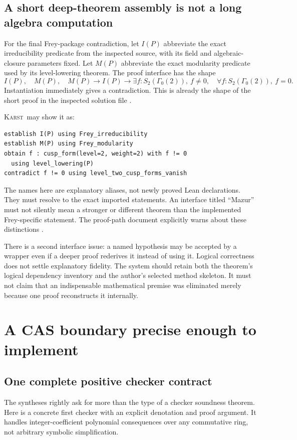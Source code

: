 \documentclass[11pt,letterpaper]{article}
\newcommand{\Karst}{\textsc{Karst}}
\theoremstyle{remark}
\begin{document}
\subsection{A short deep-theorem assembly is not a long algebra computation}
For the final Frey-package contradiction, let $I(P)$ abbreviate the exact
irreducibility predicate from the inspected source, with its field and
algebraic-closure parameters fixed. Let $M(P)$ abbreviate the exact modularity
predicate used by its level-lowering theorem. The proof interface has the
shape
\[
 I(P),\quad M(P),\quad
 M(P)\to I(P)\to\exists f:S_2(\Gamma_0(2)),\ f\ne0,
 \quad\forall f:S_2(\Gamma_0(2)),\ f=0.
\]
Instantiation immediately gives a contradiction. This is already the shape of
the short proof in the inspected solution file \cite{freysol}.

\Karst\ may show it as:
\begin{lstlisting}[caption={An interface-level sketch of the source's final contradiction.}]
establish I(P) using Frey_irreducibility
establish M(P) using Frey_modularity
obtain f : cusp_form(level=2, weight=2) with f != 0
  using level_lowering(P)
contradict f != 0 using level_two_cusp_forms_vanish
\end{lstlisting}

The names here are explanatory aliases, not newly proved Lean declarations.
They must resolve to the exact imported statements. An interface titled
``Mazur'' must not silently mean a stronger or different theorem than the
implemented Frey-specific statement. The proof-path document explicitly
warns about these distinctions \cite{fltpath}.

There is a second interface issue: a named hypothesis may be accepted by a
wrapper even if a deeper proof rederives it instead of using it. Logical
correctness does not settle explanatory fidelity. The system should retain
both the theorem's logical dependency inventory and the author's selected
method skeleton. It must not claim that an indispensable mathematical premise
was eliminated merely because one proof reconstructs it internally.

\section{A CAS boundary precise enough to implement}\label{sec:cas}

\subsection{One complete positive checker contract}
The syntheses rightly ask for more than the type of a checker soundness theorem.
Here is a concrete first checker with an explicit denotation and proof
argument. It handles integer-coefficient polynomial consequences over any
commutative ring, not arbitrary symbolic simplification.
\end{document}
